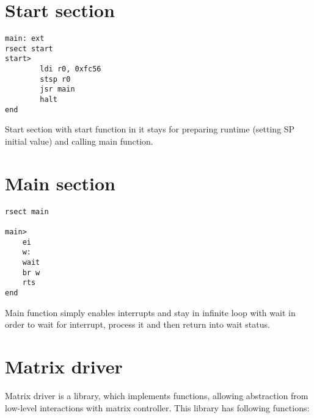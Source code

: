 \section*{Start section}

\begin{lstlisting}
main: ext
rsect start
start>
        ldi r0, 0xfc56
        stsp r0
        jsr main
        halt
end
\end{lstlisting}

Start section with start function in it stays for preparing runtime (setting SP initial value) and calling main function.

\section*{Main section}

\begin{lstlisting}
rsect main

main>
	ei
	w:
	wait
	br w
	rts
end
\end{lstlisting}

Main function simply enables interrupts and stay in infinite loop with wait in order to wait for interrupt, process it and then return into wait status.

\section*{Matrix driver}

Matrix driver is a library, which implements functions, allowing abstraction from low-level interactions with matrix controller. This library has following functions:

